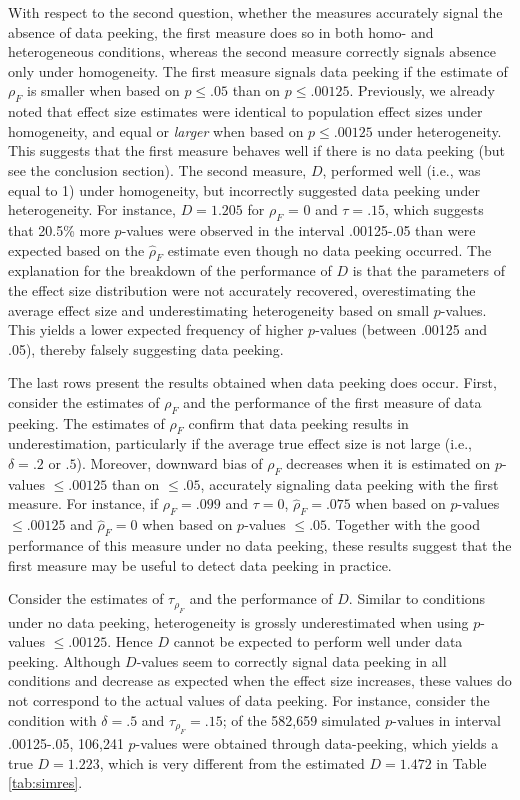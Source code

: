 \documentclass[a5paper]{book}
\begin{document}
With respect to the second question, whether the measures accurately
signal the absence of data peeking, the first measure does so in both
homo- and heterogeneous conditions, whereas the second measure correctly
signals absence only under homogeneity. The first measure signals data
peeking if the estimate of \(\rho_F\) is smaller when based on
\(p\leq.05\) than on \(p\leq.00125\). Previously, we already noted that
effect size estimates were identical to population effect sizes under
homogeneity, and equal or \emph{larger} when based on \(p\leq.00125\)
under heterogeneity. This suggests that the first measure behaves well
if there is no data peeking (but see the conclusion section). The second
measure, \(D\), performed well (i.e., was equal to 1) under homogeneity,
but incorrectly suggested data peeking under heterogeneity. For
instance, \(D=1.205\) for \(\rho_F\) = 0 and \(\tau=.15\), which
suggests that 20.5\% more \(p\)-values were observed in the interval
.00125-.05 than were expected based on the \(\hat{\rho}_F\) estimate
even though no data peeking occurred. The explanation for the breakdown
of the performance of \(D\) is that the parameters of the effect size
distribution were not accurately recovered, overestimating the average
effect size and underestimating heterogeneity based on small
\(p\)-values. This yields a lower expected frequency of higher
\(p\)-values (between .00125 and .05), thereby falsely suggesting data
peeking.

The last rows present the results obtained when data peeking does occur.
First, consider the estimates of \(\rho_F\) and the performance of the
first measure of data peeking. The estimates of \(\rho_F\) confirm that
data peeking results in underestimation, particularly if the average
true effect size is not large (i.e., \(\delta=.2\) or \(.5\)). Moreover,
downward bias of \(\rho_F\) decreases when it is estimated on
\(p\)-values \(\leq.00125\) than on \(\leq.05\), accurately signaling
data peeking with the first measure. For instance, if \(\rho_F=.099\)
and \(\tau=0\), \(\hat{\rho}_F=.075\) when based on \(p\)-values
\(\leq.00125\) and \(\hat{\rho}_F=0\) when based on \(p\)-values
\(\leq.05\). Together with the good performance of this measure under no
data peeking, these results suggest that the first measure may be useful
to detect data peeking in practice.

Consider the estimates of \(\tau_{\rho_F}\) and the performance of
\(D\). Similar to conditions under no data peeking, heterogeneity is
grossly underestimated when using \(p\)-values \(\leq.00125\). Hence
\(D\) cannot be expected to perform well under data peeking. Although
\(D\)-values seem to correctly signal data peeking in all conditions and
decrease as expected when the effect size increases, these values do not
correspond to the actual values of data peeking. For instance, consider
the condition with \(\delta=.5\) and \(\tau_{\rho_F}=.15\); of the
582,659 simulated \(p\)-values in interval .00125-.05, 106,241
\(p\)-values were obtained through data-peeking, which yields a true
\(D=1.223\), which is very different from the estimated \(D=1.472\) in
Table \ref{tab:simres}.
\end{document}
